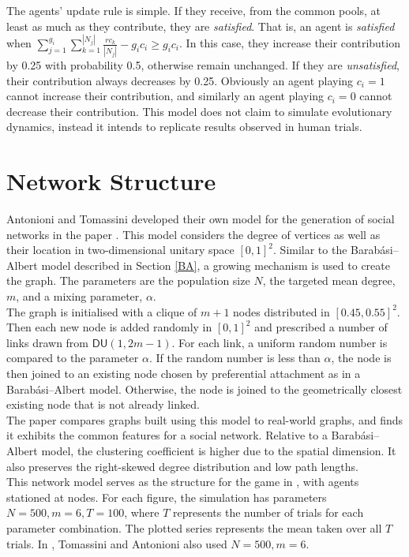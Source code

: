 The agents' update rule is simple. If they receive, from the common pools, at least as much as they contribute, they are \emph{satisfied}. That is, an agent is \emph{satisfied} when $\sum_{j=1}^{g_i} \sum_{k=1}^{|N_j|} \frac{rc_k}{|N_j|} - g_i c_i\geq g_i c_i$. In this case, they increase their contribution by 0.25 with probability 0.5, otherwise remain unchanged. If they are \emph{unsatisfied}, their contribution always decreases by 0.25. Obviously an agent playing $c_i =1$ cannot increase their contribution, and similarly an agent playing $c_i=0$ cannot decrease their contribution. This model does not claim to simulate evolutionary dynamics, instead it intends to replicate results observed in human trials. 


\section{Network Structure}
Antonioni and Tomassini developed their own model for the generation of social networks in the paper \cite{RN51}. This model considers the degree of vertices as well as their location in two-dimensional unitary space $[0,1]^2$. Similar to the Barab\'{a}si--Albert model described in Section \ref{BA}, a growing mechanism is used to create the graph. The parameters are  the population size $N$, the targeted mean degree, $m$, and  a mixing parameter, $\alpha$. \\

The graph is initialised with a clique of $m+1$ nodes distributed in $[0.45, 0.55]^2$. Then each new node is added randomly in $[0,1]^2$ and prescribed a number of links drawn from $\mathsf{DU}(1,2m-1)$. For each link, a uniform random number is compared to the parameter $\alpha$. If the random number is less than $\alpha$, the node is then joined to an existing node chosen by preferential attachment as in a Barab\'{a}si--Albert model. Otherwise, the node is joined to the geometrically closest existing node that is not already linked. \\

The paper \cite{RN51} compares graphs built using this model to real-world graphs, and finds it exhibits the common features for a social network. Relative to a Barab\'{a}si--Albert model, the clustering coefficient is higher due to the spatial dimension. It also preserves the right-skewed degree distribution and low path lengths. \\

This network model serves as the structure for the game in \cite{RN49}, with agents stationed at nodes. For each figure, the simulation has parameters $N=500, m = 6, T=100$, where $T$ represents the number of trials for each parameter combination. The plotted series represents the mean taken over all $T$ trials. In \cite{RN49}, Tomassini and Antonioni also used $N=500, m = 6$. 

